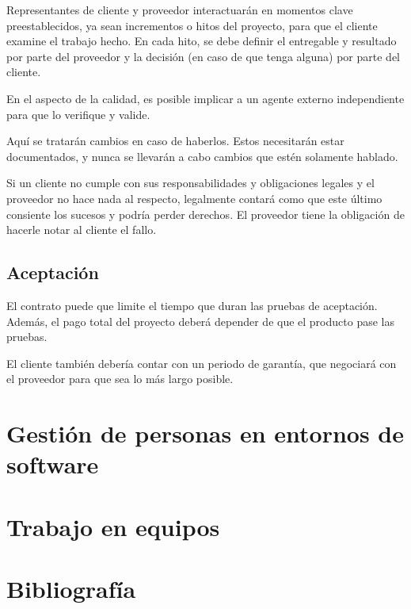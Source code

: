 \documentclass[12pt]{article}
\begin{document}
{Representantes de cliente y proveedor interactuarán en momentos clave preestablecidos, ya sean incrementos o hitos del proyecto, para que el cliente examine el trabajo hecho. En cada hito, se debe definir el entregable y resultado por parte del proveedor y la decisión (en caso de que tenga alguna) por parte del cliente.} \bigskip

{En el aspecto de la calidad, es posible implicar a un agente externo independiente para que lo verifique y valide.} \bigskip

{Aquí se tratarán cambios en caso de haberlos. Estos necesitarán estar documentados, y nunca se llevarán a cabo cambios que estén solamente hablado.} \bigskip

{Si un cliente no cumple con sus responsabilidades y obligaciones legales y el proveedor no hace nada al respecto, legalmente contará como que este último consiente los sucesos y podría perder derechos. El proveedor tiene la obligación de hacerle notar al cliente el fallo.}

\subsection{Aceptación}
\label{10.6.0}

{El contrato puede que limite el tiempo que duran las pruebas de aceptación. Además, el pago total del proyecto deberá depender de que el producto pase las pruebas.} \bigskip

{El cliente también debería contar con un periodo de garantía, que negociará con el proveedor para que sea lo más largo posible.}

\newpage
\section[Gestión de personas en entornos de software]{Gestión de personas en entornos de \\software}
\label{11.0.0}


\newpage
\section{Trabajo en equipos}
\label{12.0.0}


\newpage
\section{Bibliografía}
\label{bibliografia}
\nocite{*}
\begingroup
\renewcommand{\section}[2]{}%
\printbibliography
\endgroup
\end{document}
